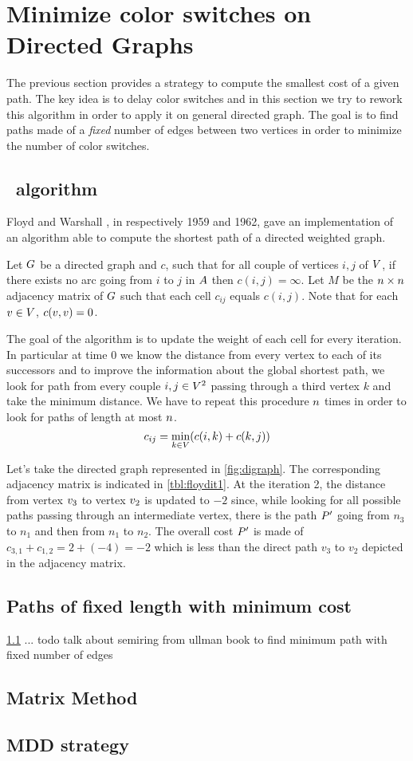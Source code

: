 \section{Minimize color switches on Directed Graphs}

The previous section provides a strategy to compute the smallest cost of a given path. The key idea is to delay color switches and in this section we try to rework this algorithm in order to apply it on general directed graph. The goal is to find paths made of a \textit{fixed} number of edges between two vertices in order to minimize the number of color switches.

\subsection{\FW\ algorithm}
\label{sec:fwalgo}

Floyd \cite[]{floyd} and Warshall \cite{warshall}, in respectively 1959 and 1962, gave an implementation \cite[]{floydalgo} of an algorithm able to compute the shortest path of a directed weighted graph.

Let $G$ be a directed graph and $c$, such that for all couple of vertices $i,j$ of $V$, if there exists no arc going from $i$ to $j$ in $A$ then  $c(i,j) = \infty$. Let $M$ be the $n \times n$ adjacency matrix of $G$ such that each cell $c_{ij}$ equals $c(i, j)$. Note that for each $v \in V$, $c(v, v) = 0$.

The goal of the algorithm is to update the weight of each cell for every iteration. In particular at time $0$ we know the distance from every vertex to each of its successors and to improve the information about the global shortest path, we look for path from every couple $i, j \in V^2$ passing through a third vertex $k$ and take the minimum distance. We have to repeat this procedure $n$ times in order to look for paths of length at most $n$.
$$c_{ij} = \min_{k \in V} (c(i, k) + c(k, j))$$





Let's take the directed graph represented in \cref{fig:digraph}. The corresponding adjacency matrix is indicated in \cref{tbl:floydit1}. At the iteration 2, the distance from vertex $v_3$ to vertex $v_2$ is updated to $-2$ since, while looking for all possible paths passing through an intermediate vertex, there is the path $P'$ going from $n_3$ to $n_1$ and then from $n_1$ to $n_2$. The overall cost $P'$ is made of $c_{3,1} + c_{1,2} = 2 + (-4) = -2$ which is less than the direct path $v_3$ to $v_2$ depicted in the adjacency matrix.

\subsection{Paths of fixed length with minimum cost}

\cref{sec:fwalgo} ... todo talk about semiring from ullman book to find minimum path with fixed number of edges

\subsection{Matrix Method}

\subsection{MDD strategy}